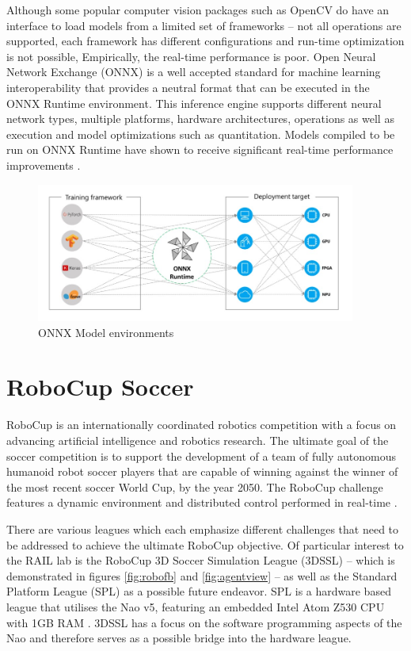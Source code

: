 \documentclass[a4paper,twoside,12pt]{report}
\begin{document}
Although some popular computer vision packages such as OpenCV do have an interface to load models from a limited set of frameworks -- not all operations are supported, each framework has different configurations and run-time optimization is not possible, Empirically, the real-time performance is poor. Open Neural Network Exchange (ONNX) is a well accepted standard \citep{onnx} for machine learning interoperability that provides a neutral format that can be executed in the ONNX Runtime environment. This inference engine supports different neural network types, multiple platforms, hardware architectures, operations as well as execution and model optimizations such as quantitation. Models compiled to be run on ONNX Runtime have shown to receive significant real-time performance improvements \citep{inference}.

\begin{figure}[h!]
\begin{center}
\includegraphics[width=10.5cm]{images/onnx.jpg}
\caption{ONNX Model environments \citep{onnx}}
\label{fig:onnxplot}
\end{center}
\end{figure}

\section{RoboCup Soccer}
RoboCup is an internationally coordinated robotics competition with a focus on advancing artificial intelligence and robotics research. The ultimate goal of the soccer competition is to support the development of a team of fully autonomous humanoid robot soccer players that are capable of winning against the winner of the most recent soccer World Cup, by the year 2050. The RoboCup challenge features a dynamic environment and distributed control performed in real-time \citep{RoboCupObj}.\

There are various leagues which each emphasize different challenges that need to be addressed to achieve the ultimate RoboCup objective. Of particular interest to the RAIL lab is the RoboCup 3D Soccer Simulation League (3DSSL) -- which is demonstrated in figures \ref{fig:robofb} and \ref{fig:agentview} -- as well as the Standard Platform League (SPL) as a possible future endeavor. SPL is a hardware based league that utilises the Nao v5, featuring an embedded Intel Atom Z530 CPU with 1GB RAM \citep{naov5}. 3DSSL has a focus on the software programming aspects of the Nao and therefore serves as a possible bridge into the hardware league.
\end{document}
